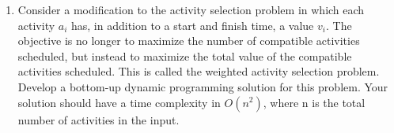 \documentclass{article}
\begin{document}
\begin{enumerate}
        \item Consider a modification to the activity selection problem in 
        which each activity $a_i$ has, in addition to a start and finish time, 
        a value $v_i$. The objective is no longer to maximize the number of 
        compatible activities scheduled, but instead to maximize the total 
        value of the compatible activities scheduled. This is called the 
        weighted activity selection problem. Develop a bottom-up dynamic 
        programming solution for this problem. Your solution should have a 
        time complexity in $O(n^2)$, where n is the total number of activities 
        in the input.
    \end{enumerate}
\end{document}
